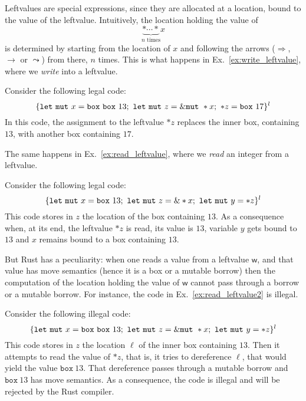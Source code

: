 Leftvalues are special expressions, since they are allocated at a location,
bound to the value of the leftvalue. Intuitively, the location holding the value of
\[
\underbrace{*\cdots*}_{n\text{ times}}x
\]
is determined by starting from the location of $x$ and following the arrows
($\Rightarrow$, $\to$ or $\leadsto$) from there, $n$ times. This is what happens
in Ex.~\ref{ex:write_leftvalue}, where we \emph{write} into a leftvalue.

\begin{example}\label{ex:write_leftvalue}
  Consider the following legal code:
  \[
  \{
  \mathtt{let\ mut}\ x = \mathtt{box}\ \mathtt{box}\ 13;\
  \mathtt{let\ mut}\ z = \&\mathtt{mut}\  *x;\
  *z = \mathtt{box}\ 17
  \}^l
  \]
  In this code, the assignment to the leftvalue $*z$
  replaces the inner box, containing $13$, with another box containing $17$.
\end{example}

\noindent
The same happens in Ex.~\ref{ex:read_leftvalue}, where we \emph{read} an integer from a leftvalue.

\begin{example}\label{ex:read_leftvalue}
  Consider the following legal code:
  \[
  \{
  \mathtt{let\ mut}\ x = \mathtt{box}\ 13;\
  \mathtt{let\ mut}\ z = \& *x;\
  \mathtt{let\ mut}\ y = *z
  \}^l
  \]
  This code stores in $z$ the location of the box containing $13$.
  As a consequence when, at its end,
  the leftvalue $*z$ is read, its value is $13$, variable $y$ gets bound to $13$
  and $x$ remains bound to a box containing $13$.
\end{example}

\noindent
But Rust has a peculiarity: when one reads a value from a leftvalue $\mathsf{w}$, and that value has move semantics
(hence it is a box or a mutable borrow) then the computation of the location holding the value of $\mathsf{w}$
cannot pass through a borrow or a mutable borrow. For instance, the code in Ex.~\ref{ex:read_leftvalue2} is illegal.

\begin{example}\label{ex:read_leftvalue2}
  Consider the following illegal code:
  \[
    \{
      \mathtt{let\ mut}\ x = \mathtt{box}\ \mathtt{box}\ 13;\
      \mathtt{let\ mut}\ z = \&\mathtt{mut}\  *x;\
      \mathtt{let\ mut}\ y = *z
    \}^l
    \]
    This code stores in $z$ the location $\ell$ of the inner box containing $13$.
    Then it attempts to read the value of $*z$, that is, it tries to dereference $\ell$, that would
    yield the value $\mathtt{box}\ 13$. That dereference passes through a mutable borrow and
    $\mathtt{box}\ 13$ has move semantics. As a consequence, the code is illegal and will be rejected
    by the Rust compiler.
\end{example}

